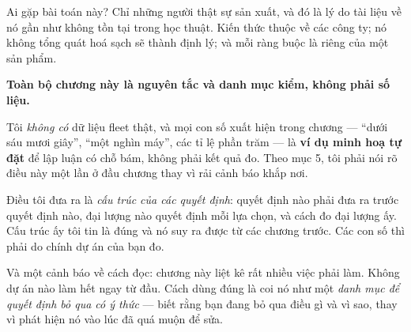 \documentclass[../../vslam.tex]{subfiles}
\begin{document}
Ai gặp bài toán này? Chỉ những người thật sự sản xuất, và đó là lý do tài liệu về nó gần như không tồn tại trong học thuật. Kiến thức thuộc về các công ty; nó không tổng quát hoá sạch sẽ thành định lý; và mỗi ràng buộc là riêng của một sản phẩm.

\begin{cambay}
\textbf{Toàn bộ chương này là nguyên tắc và danh mục kiểm, không phải số liệu.}

Tôi \emph{không có} dữ liệu fleet thật, và mọi con số xuất hiện trong chương --- ``dưới sáu mươi giây'', ``một nghìn máy'', các tỉ lệ phần trăm --- là \textbf{ví dụ minh hoạ tự đặt} để lập luận có chỗ bám, không phải kết quả đo. Theo  mục 5, tôi phải nói rõ điều này một lần ở đầu chương thay vì rải cảnh báo khắp nơi.

Điều tôi đưa ra là \emph{cấu trúc của các quyết định}: quyết định nào phải đưa ra trước quyết định nào, đại lượng nào quyết định mỗi lựa chọn, và cách đo đại lượng ấy. Cấu trúc ấy tôi tin là đúng và nó suy ra được từ các chương trước. Các con số thì phải do chính dự án của bạn đo.

Và một cảnh báo về cách đọc: chương này liệt kê rất nhiều việc phải làm. Không dự án nào làm hết ngay từ đầu. Cách dùng đúng là coi nó như một \emph{danh mục để quyết định bỏ qua có ý thức} --- biết rằng bạn đang bỏ qua điều gì và vì sao, thay vì phát hiện nó vào lúc đã quá muộn để sửa.
\end{cambay}
\end{document}
